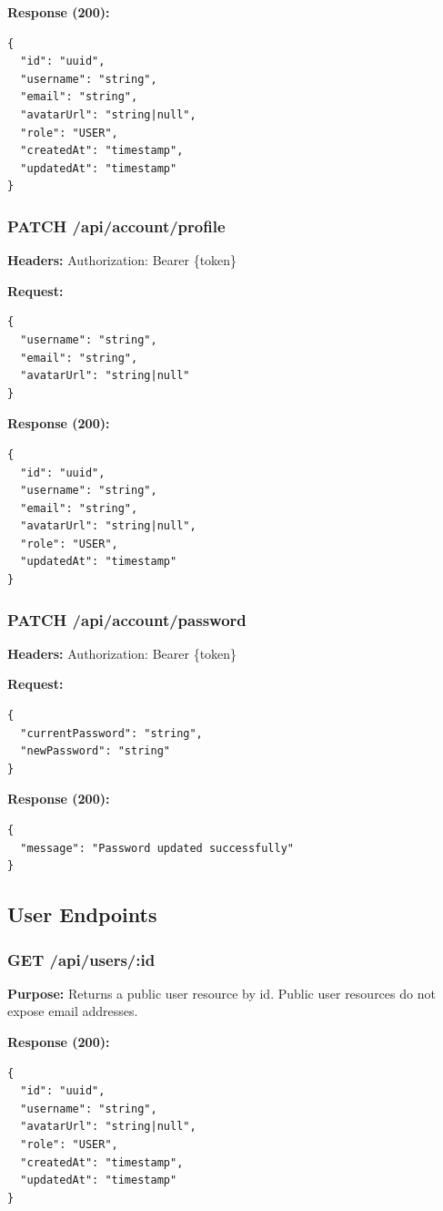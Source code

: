 \documentclass[11pt,a4paper]{article}
\begin{document}
\textbf{Response (200):}
\begin{lstlisting}
{
  "id": "uuid",
  "username": "string",
  "email": "string",
  "avatarUrl": "string|null",
  "role": "USER",
  "createdAt": "timestamp",
  "updatedAt": "timestamp"
}
\end{lstlisting}

\subsubsection{PATCH /api/account/profile}
\textbf{Headers:} Authorization: Bearer \{token\}

\textbf{Request:}
\begin{lstlisting}
{
  "username": "string",
  "email": "string",
  "avatarUrl": "string|null"
}
\end{lstlisting}

\textbf{Response (200):}
\begin{lstlisting}
{
  "id": "uuid",
  "username": "string",
  "email": "string",
  "avatarUrl": "string|null",
  "role": "USER",
  "updatedAt": "timestamp"
}
\end{lstlisting}

\subsubsection{PATCH /api/account/password}
\textbf{Headers:} Authorization: Bearer \{token\}

\textbf{Request:}
\begin{lstlisting}
{
  "currentPassword": "string",
  "newPassword": "string"
}
\end{lstlisting}

\textbf{Response (200):}
\begin{lstlisting}
{
  "message": "Password updated successfully"
}
\end{lstlisting}

\subsection{User Endpoints}

\subsubsection{GET /api/users/:id}
\textbf{Purpose:} Returns a public user resource by id. Public user resources do not expose email addresses.

\textbf{Response (200):}
\begin{lstlisting}
{
  "id": "uuid",
  "username": "string",
  "avatarUrl": "string|null",
  "role": "USER",
  "createdAt": "timestamp",
  "updatedAt": "timestamp"
}
\end{lstlisting}
\end{document}
